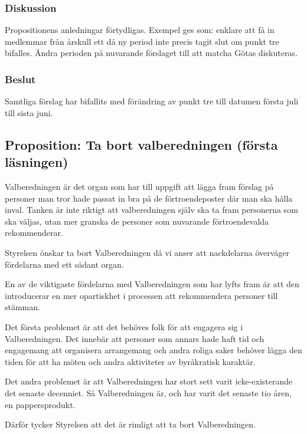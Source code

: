 \documentclass[protokoll]{dvd}
\begin{document}
\subsubsection{Diskussion}
Propositionens anledningar förtydligas. Exempel ges som: enklare att få in medlemmar från årskull ett då ny period inte precis tagit slut om punkt tre bifalles.
Ändra perioden på nuvarande förslaget till att matcha Götas diskuteras.  

\subsubsection{Beslut}
\begin{attsatser}
	\item Samtliga förslag har bifallits med förändring av punkt tre till datumen första juli till sista juni.
\end{attsatser}


\newpage
\subsection{Proposition: Ta bort valberedningen (första läsningen)}

Valberedningen är det organ som har till uppgift att lägga fram förslag på personer man tror hade passat in bra på de förtroendeposter där man ska hålla inval.
Tanken är inte riktigt att valberedningen själv ska ta fram personerna som ska väljas, utan mer granska de personer som nuvarande förtroendevalda rekommenderar.

Styrelsen önskar ta bort Valberedningen då vi anser att nackdelarna överväger fördelarna med ett sådant organ.

En av de viktigaste fördelarna med Valberedningen som har lyfts fram är att den introducerar en mer opartiskhet i processen att rekommendera personer till stämman.

Det första problemet är att det behöves folk för att engagera sig i Valberedningen.
Det innebär att personer som annars hade haft tid och engagemang att organisera arrangemang och andra roliga saker behöver lägga den tiden för att ha möten och andra aktiviteter av byråkratisk karaktär.

Det andra problemet är att Valberedningen har stort sett varit icke-existerande det senaste decenniet.
Så Valberedningen är, och har varit det senaste tio åren, en pappersprodukt.

Därför tycker Styrelsen att det är rimligt att ta bort Valberedningen.
\end{document}
